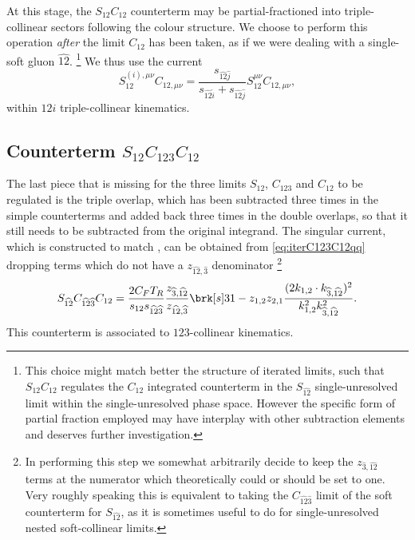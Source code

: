 \documentclass[11pt,a4paper]{article}
\newcommand{\mpd}[1]{\widehat{#1}}
\begin{document}
At this stage, the $S_{12}C_{12}$ counterterm may be partial-fractioned
into triple-collinear sectors following the colour structure.
We choose to perform this operation \emph{after} the limit $C_{12}$
has been taken, as if we were dealing with a single-soft gluon $\mpd{12}$.%
\footnote{
This choice might match better the structure of iterated limits,
such that $S_{12}C_{12}$ regulates the $C_{12}$ integrated counterterm
in the $S_{\mpd{12}}$ single-unresolved limit
within the single-unresolved phase space.
However the specific form of partial fraction employed
may have interplay with other subtraction elements
and deserves further investigation.
}
We thus use the current
\begin{equation}
	S_{12}^{(i),\mu\nu} C_{12,\mu\nu}
	= \frac{s_{\mpd{12}\mpd{j}}}{s_{\mpd{12}\mpd{i}}+s_{\mpd{12}\mpd{j}}}
	S_{12}^{\mu\nu} C_{12,\mu\nu},
\end{equation}
within $12i$ triple-collinear kinematics.


\subsection{Counterterm $S_{12}C_{123}C_{12}$}

The last piece that is missing for the three limits
$S_{12}$, $C_{123}$ and $C_{12}$ to be regulated is the triple overlap,
which has been subtracted three times in the simple counterterms
and added back three times in the double overlaps,
so that it still needs to be subtracted from the original integrand.
The singular current, which is constructed to match \cite{Somogyi:2006da},
can be obtained from \cref{eq:iterC123C12qq} dropping terms
which do not have a $z_{\mpd{12},\mpd{3}}$ denominator%
\footnote{
In performing this step we somewhat arbitrarily decide
to keep the $z_{\mpd{3},\mpd{12}}$ terms at the numerator
which theoretically could or should be set to one.
Very roughly speaking this is equivalent to taking
the $C_{\mpd{12}\mpd{3}}$ limit of the soft counterterm for $S_{\mpd{12}}$,
as it is sometimes useful to do for single-unresolved
nested soft-collinear limits.
}
\begin{equation}
	S_{\mpd{12}} C_{\mpd{12}\mpd{3}} C_{12}
	= \frac{2 C_F T_R}{s_{12}s_{\mpd{12}\mpd{3}}}
	\frac{z_{\mpd{3},\mpd{12}}}{z_{\mpd{12},\mpd{3}}}
	\brk[s]3{
		1 - z_{1,2} z_{2,1}
		\frac{(2k_{1,2}\cdot k_{\mpd{3},\mpd{12}})^2}
		{k_{1,2}^2 k_{\mpd{3},\mpd{12}}^2}
	}.
\end{equation}
This counterterm is associated to $123$-collinear kinematics.
\end{document}
